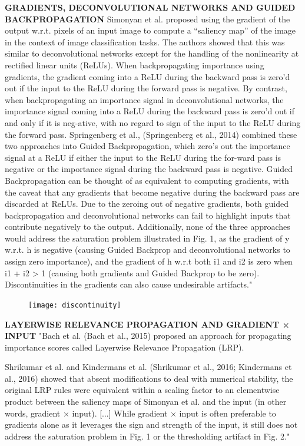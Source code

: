 		\textbf{GRADIENTS, DECONVOLUTIONAL NETWORKS AND GUIDED BACKPROPAGATION}
		Simonyan et al. \cite{Simonyan2014} proposed using the gradient of the output w.r.t. pixels of an input image to compute a “saliency map” of the image in the context of image classification tasks. The authors showed that this was similar to deconvolutional networks \cite{Zeiler2014} except for the handling of the nonlinearity at rectified linear units (ReLUs). When backpropagating importance using gradients, the gradient coming into a ReLU during the backward pass is zero’d out if the input to the ReLU during the forward pass is negative. By contrast, when backpropagating an importance signal in deconvolutional networks, the importance signal coming into a ReLU during the backward pass is zero’d out if and only if it is neg-ative, with no regard to sign of the input to the ReLU during the forward pass.
		Springenberg et al., (Springenberg et al., 2014) combined these two approaches into Guided Backpropagation, which zero’s out the importance signal at a ReLU if either the input to the ReLU during the for-ward pass is negative or the importance signal during the backward pass is negative. Guided Backpropagation can be thought of as equivalent to computing gradients, with the caveat that any gradients that become negative during the backward pass are discarded at ReLUs. Due to the zeroing out of negative gradients, both guided backpropagation and deconvolutional networks can fail to highlight inputs that contribute negatively to the output. Additionally, none of the three approaches would address the saturation problem illustrated in Fig. 1, as the gradient of y w.r.t. h is negative (causing Guided Backprop and deconvolutional networks to assign zero importance), and the gradient of h w.r.t both i1 and i2 is zero when i1 + i2 > 1 (causing both gradients and Guided Backprop to be zero). Discontinuities in the gradients can also cause undesirable artifacts." \cite{Shrikumar2017}
		\begin{figure}[h]
			\centering
			\texttt{[image: discontinuity]}
		\end{figure}
		
		\textbf{LAYERWISE RELEVANCE PROPAGATION AND GRADIENT × INPUT}
		"Bach et al. (Bach et al., 2015) proposed an approach for propagating importance scores called Layerwise Relevance Propagation (LRP).
		
		Shrikumar et al. and Kindermans et al. (Shrikumar et al., 2016; Kindermans et al., 2016) showed that absent modifications to deal with numerical stability, the original LRP rules were equivalent within a scaling factor to an elementwise product between the saliency maps of Simonyan et al. and the input (in other words, gradient × input).
		[...]
		While gradient × input is often preferable to gradients alone as it leverages the sign and strength of the input, it still does not address the saturation problem in Fig. 1 or the thresholding artifact in Fig. 2." \cite{Shrikumar2017}
		
